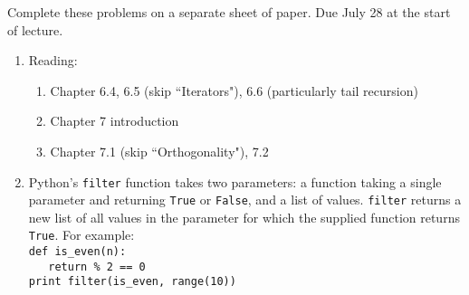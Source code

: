 \documentclass[9pt]{article}
\begin{document}
\noindent Complete these problems on a separate sheet of paper. Due July 28 at
the start of lecture.
\begin{enumerate}
   \item Reading:

         \begin{enumerate}
            \item Chapter 6.4, 6.5 (skip ``Iterators"), 6.6 (particularly tail
                  recursion)
            \item Chapter 7 introduction
            \item Chapter 7.1 (skip ``Orthogonality"), 7.2
         \end{enumerate}
   \item Python's \verb|filter| function takes two parameters: a function taking
         a single parameter and returning \verb|True| or \verb|False|, and a
         list of values. \verb|filter| returns a new list of all values in the
         parameter for which the supplied function returns \verb|True|. For
         example: \\

         \verb|def is_even(n):| \\
         \verb|   return % 2 == 0| \\
         \verb|print filter(is_even, range(10))| \\


\end{enumerate}
\end{document}
